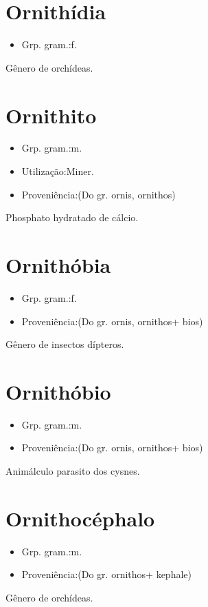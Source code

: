 \section{Ornithídia}
\begin{itemize}
\item {Grp. gram.:f.}
\end{itemize}
Gênero de orchídeas.
\section{Ornithito}
\begin{itemize}
\item {Grp. gram.:m.}
\end{itemize}
\begin{itemize}
\item {Utilização:Miner.}
\end{itemize}
\begin{itemize}
\item {Proveniência:(Do gr. \textunderscore ornis\textunderscore , \textunderscore ornithos\textunderscore )}
\end{itemize}
Phosphato hydratado de cálcio.
\section{Ornithóbia}
\begin{itemize}
\item {Grp. gram.:f.}
\end{itemize}
\begin{itemize}
\item {Proveniência:(Do gr. \textunderscore ornis\textunderscore , \textunderscore ornithos\textunderscore  + \textunderscore bios\textunderscore )}
\end{itemize}
Gênero de insectos dípteros.
\section{Ornithóbio}
\begin{itemize}
\item {Grp. gram.:m.}
\end{itemize}
\begin{itemize}
\item {Proveniência:(Do gr. \textunderscore ornis\textunderscore , \textunderscore ornithos\textunderscore  + \textunderscore bios\textunderscore )}
\end{itemize}
Animálculo parasito dos cysnes.
\section{Ornithocéphalo}
\begin{itemize}
\item {Grp. gram.:m.}
\end{itemize}
\begin{itemize}
\item {Proveniência:(Do gr. \textunderscore ornithos\textunderscore  + \textunderscore kephale\textunderscore )}
\end{itemize}
Gênero de orchídeas.
